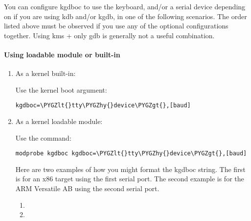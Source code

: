 \documentclass[a4paper,8pt,english]{sphinxmanual}
\def\PYGZlt{\char`\<}
\def\PYGZgt{\char`\>}
\def\PYGZhy{\char`\-}
\begin{document}
You can configure kgdboc to use the keyboard, and/or a serial device
depending on if you are using kdb and/or kgdb, in one of the following
scenarios. The order listed above must be observed if you use any of the
optional configurations together. Using kms + only gdb is generally not
a useful combination.


\paragraph{Using loadable module or built-in}
\label{dev-tools/kgdb:using-loadable-module-or-built-in}\begin{enumerate}
\item {} 
As a kernel built-in:

Use the kernel boot argument:

\begin{Verbatim}[commandchars=\\\{\}]
kgdboc=\PYGZlt{}tty\PYGZhy{}device\PYGZgt{},[baud]
\end{Verbatim}

\item {} 
As a kernel loadable module:

Use the command:

\begin{Verbatim}[commandchars=\\\{\}]
modprobe kgdboc kgdboc=\PYGZlt{}tty\PYGZhy{}device\PYGZgt{},[baud]
\end{Verbatim}

Here are two examples of how you might format the kgdboc string. The
first is for an x86 target using the first serial port. The second
example is for the ARM Versatile AB using the second serial port.
\begin{enumerate}
\item {} 

\item {} 

\end{enumerate}

\end{enumerate}
\end{document}
